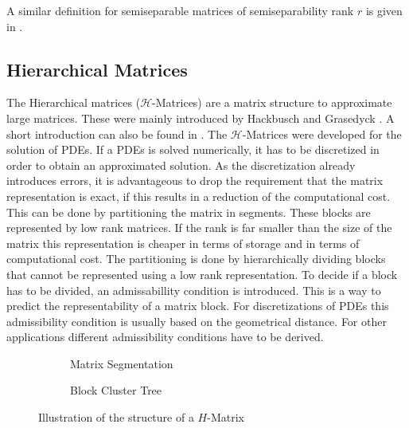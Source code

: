 \documentclass[doctype=mastersthesis,BCOR=15mm,biblatex]{ldvbook}%
\begin{document}
A similar definition for semiseparable matrices of semiseparability rank $r$ is given in \cite{vandebril_bibliography_2005}.

\subsection{Hierarchical Matrices}\label{subsec:H-mat}
The Hierarchical matrices ($\mathcal{H}$-Matrices) are a matrix structure to approximate large matrices. These were mainly introduced by Hackbusch \cite{hackbusch_hierarchische_2009} and Grasedyck \cite{grasedyck_theorie_2001}.
A short introduction can also be found in \cite{grasedyck_adaptive_2004}.
The $\mathcal{H}$-Matrices were developed for the solution of PDEs.
If a PDEs is solved numerically, it has to be discretized in order to obtain an approximated solution.
As the discretization already introduces errors, it is advantageous to drop the requirement that the matrix representation is exact, if this results in a reduction of the computational cost.
This can be done by partitioning the matrix in segments. These blocks are represented by low rank matrices. If the rank is far smaller than the size of the matrix this representation is cheaper in terms of storage and in terms of computational cost.
The partitioning is done by hierarchically dividing blocks that cannot be represented using a low rank representation.
To decide if a block has to be divided, an admissabillity condition is introduced.
This is a way to predict the representability of a matrix block.
For discretizations of PDEs this admissibility condition is usually based on the geometrical distance.
For other applications different admissibility conditions have to be derived.

\begin{figure}
	\centering
	\begin{subfigure}[b]{0.45\textwidth}
		\centering
		
		\caption{Matrix Segmentation}
		\label{fig:strukturh-matrix_a}
	\end{subfigure}
	\begin{subfigure}[b]{0.45\textwidth}
	\centering
	\resizebox{0.7\textwidth}{!}{
	
	}
	\caption{Block Cluster Tree}
	\label{fig:strukturh-matrix_b}
	\end{subfigure}
	\caption{Illustration of the structure of a $H$-Matrix}
	\label{fig:strukturh-matrix}
\end{figure}
\end{document}

